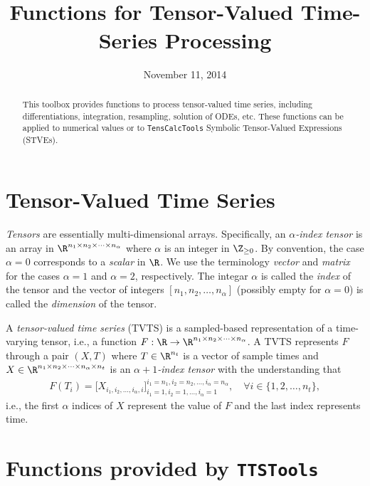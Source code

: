 \documentclass[11pt]{article}
\title{\sc \TTS \\[1em]\Large \matlab{} Functions for Tensor-Valued Time-Series Processing}
\author{\jph}
\date{November 11, 2014}
\newcommand{\TC}{\texttt{TensCalcTools}}
\newcommand{\TTS}{\texttt{TTSTools}}
\begin{document}
                        \maketitle

\begin{abstract}
  This toolbox provides functions to process tensor-valued time
  series, including differentiations, integration, resampling,
  solution of ODEs, etc. These functions can be applied to numerical
  values or to \TC{} Symbolic Tensor-Valued Expressions (STVEs).
\end{abstract}

\tableofcontents


\section{Tensor-Valued Time Series}

\emph{Tensors} are essentially multi-dimensional arrays. Specifically,
an \emph{$\alpha$-index tensor} is an array in $\R^{n_1\times n_2\times\cdots\times n_\alpha}$ where
$\alpha$ is an integer in $\Z_{\ge 0}$. By convention, the case $\alpha=0$
corresponds to a \emph{scalar} in $\R$. We use the terminology
\emph{vector} and \emph{matrix} for the cases $\alpha=1$ and $\alpha=2$,
respectively. The integar $\alpha$ is called the \emph{index} of the tensor
and the vector of integers $[n_1,n_2,\dots,n_\alpha]$ (possibly empty for
$\alpha=0$) is called the \emph{dimension} of the tensor.

\medskip

A \emph{tensor-valued time series} (TVTS) is a sampled-based
representation of a time-varying tensor, i.e., a function $F:\R\to \R^{n_1\times
  n_2\times\cdots\times n_\alpha}$. A TVTS represents $F$ through a pair $(X,T)$ where
$T\in\R^{n_t}$ is a vector of sample times
and $X\in\R^{n_1\times n_2\times\cdots\times
  n_\alpha\times n_t}$ is an \emph{$\alpha+1$-index tensor} with the understanding that
\begin{align*}
  F(T_i)=\big[ X_{i_1,i_2,\dots,i_\alpha,i}\big]_{i_1=1,i_2=1,\dots,i_\alpha=1}^{i_1=n_1,i_2=n_2,\dots,i_\alpha=n_\alpha},
  \quad\forall i\in\{1,2,\dots,n_t\},
\end{align*}
i.e., the first $\alpha$ indices of $X$ represent the value of $F$ and the
last index represents time.

\newpage

\section{Functions provided by \TTS}
\end{document}
